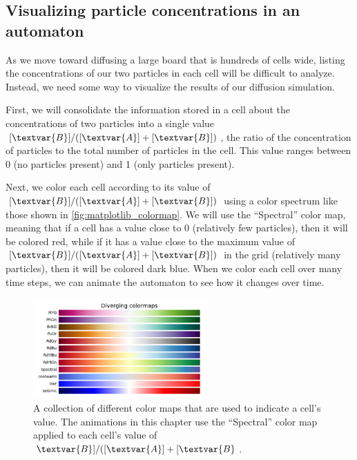\begin{qbox}[%
Update the cells in \autoref{fig:two_particle_concentration_diffusion} after another generation of diffusion, using the diffusion rates $d_A = 0.2$ and $d_B = 0.1$.
]\end{qbox}

\FloatBarrier
{}
\subsection{Visualizing particle concentrations in an automaton}

As we move toward diffusing a large board that is hundreds of cells wide, listing the concentrations of our two particles in each cell will be difficult to analyze. Instead, we need some way to visualize the results of our diffusion simulation.

First, we will consolidate the information stored in a cell about the concentrations of two particles into a single value $[\textvar{B}]/([\textvar{A}] + [\textvar{B}])$, the ratio of the concentration of  particles to the total number of particles in the cell. This value ranges between 0 (no  particles present) and 1 (only  particles present).\\

\begin{qbox}\end{qbox}

Next, we color each cell according to its value of $[\textvar{B}]/([\textvar{A}] + [\textvar{B}])$ using a color spectrum like those shown in \autoref{fig:matplotlib_colormap}. We will use the ``Spectral'' color map, meaning that if a cell has a value close to 0 (relatively few  particles), then it will be colored red, while if it has a value close to the maximum value of $[\textvar{B}]/([\textvar{A}] + [\textvar{B}])$ in the grid (relatively many  particles), then it will be colored dark blue. When we color each cell over many time steps, we can animate the automaton to see how it changes over time.\\

\begin{figure}[h]
\centering
\mySfFamily
\includegraphics[width = 0.6\textwidth]{../images/matplotlib_colormap}
\caption{A collection of different color maps that are used to indicate a cell's value. The animations in this chapter use the ``Spectral'' color map applied to each cell's value of $\textvar{B}]/([\textvar{A}] + [\textvar{B}$.}
\label{fig:matplotlib_colormap}
\end{figure}

